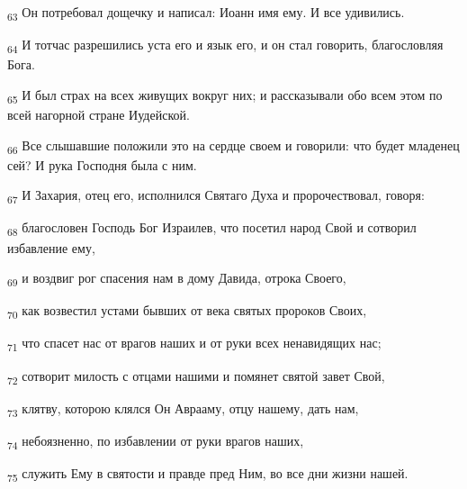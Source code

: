 \begin{tcolorbox}
\textsubscript{63} Он потребовал дощечку и написал: Иоанн имя ему. И все удивились.
\end{tcolorbox}
\begin{tcolorbox}
\textsubscript{64} И тотчас разрешились уста его и язык его, и он стал говорить, благословляя Бога.
\end{tcolorbox}
\begin{tcolorbox}
\textsubscript{65} И был страх на всех живущих вокруг них; и рассказывали обо всем этом по всей нагорной стране Иудейской.
\end{tcolorbox}
\begin{tcolorbox}
\textsubscript{66} Все слышавшие положили это на сердце своем и говорили: что будет младенец сей? И рука Господня была с ним.
\end{tcolorbox}
\begin{tcolorbox}
\textsubscript{67} И Захария, отец его, исполнился Святаго Духа и пророчествовал, говоря:
\end{tcolorbox}
\begin{tcolorbox}
\textsubscript{68} благословен Господь Бог Израилев, что посетил народ Свой и сотворил избавление ему,
\end{tcolorbox}
\begin{tcolorbox}
\textsubscript{69} и воздвиг рог спасения нам в дому Давида, отрока Своего,
\end{tcolorbox}
\begin{tcolorbox}
\textsubscript{70} как возвестил устами бывших от века святых пророков Своих,
\end{tcolorbox}
\begin{tcolorbox}
\textsubscript{71} что спасет нас от врагов наших и от руки всех ненавидящих нас;
\end{tcolorbox}
\begin{tcolorbox}
\textsubscript{72} сотворит милость с отцами нашими и помянет святой завет Свой,
\end{tcolorbox}
\begin{tcolorbox}
\textsubscript{73} клятву, которою клялся Он Аврааму, отцу нашему, дать нам,
\end{tcolorbox}
\begin{tcolorbox}
\textsubscript{74} небоязненно, по избавлении от руки врагов наших,
\end{tcolorbox}
\begin{tcolorbox}
\textsubscript{75} служить Ему в святости и правде пред Ним, во все дни жизни нашей.
\end{tcolorbox}
